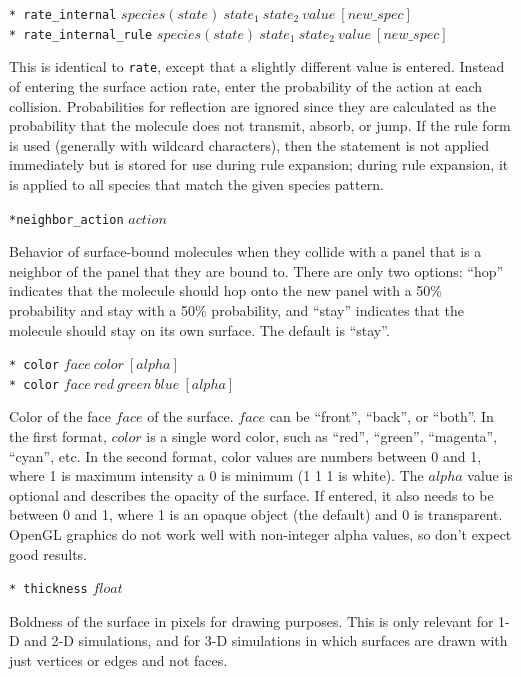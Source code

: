 \documentclass {book}
\newcommand {\ttt} {\texttt}
\begin{document}
\begin{description}
\item{\ttt{* rate\_internal} $species(state)\ state_1\ state_2\ value\ [new\_spec]$\\
\ttt{* rate\_internal\_rule} $species(state)\ state_1\ state_2\ value\ [new\_spec]$}

This is identical to \ttt{rate}, except that a slightly different value is entered. Instead of entering the surface action rate, enter the probability of the action at each collision. Probabilities for reflection are ignored since they are calculated as the probability that the molecule does not transmit, absorb, or jump. If the rule form is used (generally with wildcard characters), then the statement is not applied immediately but is stored for use during rule expansion; during rule expansion, it is applied to all species that match the given species pattern.

\item{\ttt{*neighbor\_action} $action$}

Behavior of surface-bound molecules when they collide with a panel that is a neighbor of the panel that they are bound to. There are only two options: ``hop'' indicates that the molecule should hop onto the new panel with a 50\% probability and stay with a 50\% probability, and ``stay'' indicates that the molecule should stay on its own surface. The default is ``stay''.

\item{\ttt{* color} $face\ color\ [alpha]$\\
\ttt{* color} $face\ red\ green\ blue\ [alpha]$}

Color of the face $face$ of the surface. $face$ can be ``front'', ``back'', or ``both''. In the first format, $color$ is a single word color, such as ``red'', ``green'', ``magenta'', ``cyan'', etc. In the second format, color values are numbers between 0 and 1, where 1 is maximum intensity a 0 is minimum (1 1 1 is white). The $alpha$ value is optional and describes the opacity of the surface. If entered, it also needs to be between 0 and 1, where 1 is an opaque object (the default) and 0 is transparent. OpenGL graphics do not work well with non-integer alpha values, so don't expect good results.

\item{\ttt{* thickness} $float$}

Boldness of the surface in pixels for drawing purposes. This is only relevant for 1-D and 2-D simulations, and for 3-D simulations in which surfaces are drawn with just vertices or edges and not faces.


\end{description}
\end{document}
